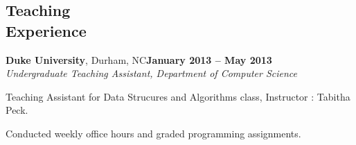 \documentclass[11pt,margin,line]{cv}
\begin{document}
\begin{resume}
    \section{\mysidestyle Teaching\\Experience}
    \textbf{Duke University}, Durham, NC\hfill \textbf{January 2013 -- May 2013} \vspace{1mm}\\\vspace{0mm}%
    \textsl{Undergraduate Teaching Assistant, Department of Computer Science}
    \vspace{-2mm}\\\vspace{-1mm}%
    \begin{list3}
        \item Teaching Assistant for Data Strucures and Algorithms class, Instructor : Tabitha Peck.
        \item Conducted weekly office hours and graded programming assignments.
    \end{list3}


\end{resume}
\end{document}

